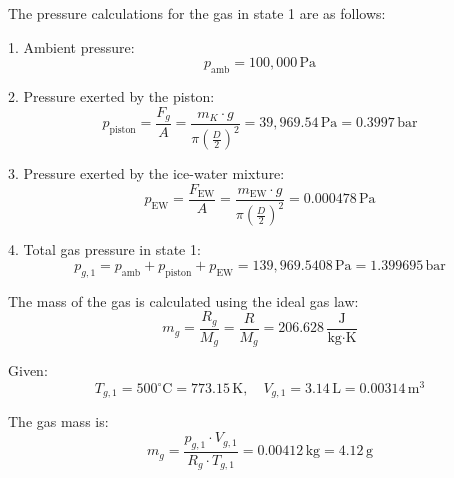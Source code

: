 The pressure calculations for the gas in state 1 are as follows:  

1. Ambient pressure:  
\[
p_{\text{amb}} = 100,000 \, \text{Pa}
\]

2. Pressure exerted by the piston:  
\[
p_{\text{piston}} = \frac{F_g}{A} = \frac{m_K \cdot g}{\pi \left(\frac{D}{2}\right)^2} = 39,969.54 \, \text{Pa} = 0.3997 \, \text{bar}
\]

3. Pressure exerted by the ice-water mixture:  
\[
p_{\text{EW}} = \frac{F_{\text{EW}}}{A} = \frac{m_{\text{EW}} \cdot g}{\pi \left(\frac{D}{2}\right)^2} = 0.000478 \, \text{Pa}
\]

4. Total gas pressure in state 1:  
\[
p_{g,1} = p_{\text{amb}} + p_{\text{piston}} + p_{\text{EW}} = 139,969.5408 \, \text{Pa} = 1.399695 \, \text{bar}
\]

The mass of the gas is calculated using the ideal gas law:  
\[
m_g = \frac{R_g}{M_g} = \frac{R}{M_g} = 206.628 \, \frac{\text{J}}{\text{kg·K}}
\]

Given:  
\[
T_{g,1} = 500^\circ\text{C} = 773.15 \, \text{K}, \quad V_{g,1} = 3.14 \, \text{L} = 0.00314 \, \text{m}^3
\]

The gas mass is:  
\[
m_g = \frac{p_{g,1} \cdot V_{g,1}}{R_g \cdot T_{g,1}} = 0.00412 \, \text{kg} = 4.12 \, \text{g}
\]